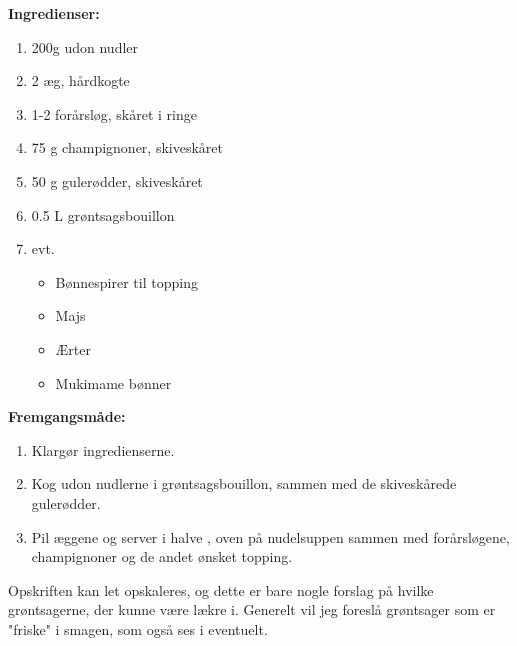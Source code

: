 \documentclass{book}
\begin{document}
\begin{minipage}[t]{0.5\textwidth}
\textbf{Ingredienser:}
\begin{enumerate}
    \item 200g udon nudler
    \item 2 æg, hårdkogte
    \item 1-2 forårsløg, skåret i ringe
    \item 75 g champignoner, skiveskåret 
    \item 50 g gulerødder, skiveskåret 
    \item 0.5 L grøntsagsbouillon 
    \item evt.
    \begin{itemize}
        \item Bønnespirer til topping
        \item Majs
        \item Ærter
        \item Mukimame bønner
    \end{itemize}
\end{enumerate}
\end{minipage}
\begin{minipage}[t]{0.5\textwidth}
\textbf{Fremgangsmåde:}
\begin{enumerate}
    \item Klargør ingredienserne.
    \item Kog udon nudlerne i grøntsagsbouillon, sammen med de skiveskårede gulerødder.
    \item Pil æggene og server i halve , oven på nudelsuppen sammen med forårsløgene, champignoner og de andet ønsket topping.  
\end{enumerate}
\end{minipage}
Opskriften kan let opskaleres, og dette er bare nogle forslag på hvilke grøntsagerne, der kunne være lækre i. Generelt vil jeg foreslå grøntsager som er "friske" i smagen, som også ses i eventuelt.
\end{document}
